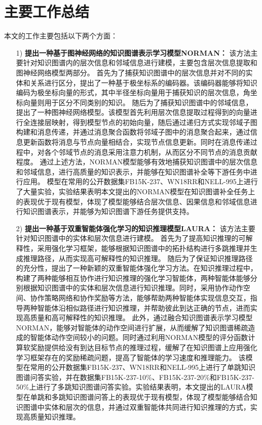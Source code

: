 \documentclass[algorithmlist, AutoFakeBold, AutoFakeSlant, figurelist, tablelist, nomlist, engineering]{seuthesix}
\begin{document}
\section{主要工作总结}
本文的工作主要包括以下两个方面：
\begin{itemize}
  \item [1)]\textbf{提出一种基于图神经网络的知识图谱表示学习模型NORMAN：}
  该方法主要针对知识图谱内的层次信息和邻域信息进行建模，主要包含层次信息提取和图神经网络模型两部分。
  首先为了捕获知识图谱中的层次信息并对不同的实体和关系进行区分，提出了一种基于极坐标系的编码器。该编码器能够将知识编码为极坐标向量的形式，其中半径坐标向量用于捕获知识的层次信息，角坐标向量则用于区分不同类别的知识。
  随后为了捕获知识图谱中的邻域信息，提出了一种图神经网络模型。该模型首先利用层次信息提取过程得到的向量进行全连接层映射，得到模型节点的初始向量，随后通过递归方式实现邻域子图构建和消息传递，并通过消息聚合函数将邻域子图中的消息聚合起来，通过信息更新函数将消息与节点向量相结合，实现节点信息更新。同时在消息传递过程中，对各个邻域节点的消息采用注意力机制，从而区分不同节点的消息贡献程度。
  通过上述方法，NORMAN模型能够有效地捕获知识图谱中的层次信息和邻域信息，进行高质量的知识表示，并能够在知识图谱补全等下游任务中进行应用。
  模型在常用的公开数据集FB15K-237、WN18RR和NELL-995上进行了大量实验，实验结果表明本文提出的NORMAN模型在知识图谱补全任务上的表现优于现有模型，体现了模型能够结合层次信息、因果信息和邻域信息进行知识图谱表示，并能够为知识图谱下游任务提供支持。
  \item [2)]\textbf{提出一种基于双重智能体强化学习的知识推理模型LAURA：}
  该方法主要针对知识图谱中的实体和层次信息进行建模。
  首先为了提高知识推理的可解释性，采用强化学习框架，能够根据知识图谱中的拓扑结构进行多跳推理并生成推理路径，从而实现高可解释性的知识推理。
  随后为了保证知识推理路径的充分性，提出了一种新颖的双重智能体强化学习方法。在知识推理过程中，构建了两种能够相互协作进行知识推理的强化学习智能体，两种智能体能够分别根据知识图谱中的实体和层次信息进行知识推理。同时，采用协作动作空间、协作策略网络和协作奖励等方法，能够帮助两种智能体实现信息交互，指导两种智能体沿相似路径进行知识推理，并帮助彼此到达正确的节点，进而实现高质量和高可解释性的知识推理。
  此外，通过融合知识图谱表示学习模型NORMAN，能够对智能体的动作空间进行扩展，从而缓解了知识图谱稀疏造成的智能体动作空间较小的问题。同时通过利用NORMAN模型的评分函数计算软奖励提供给没有到达目标节点的推理过程，缓解了在知识图谱上应用强化学习框架存在的奖励稀疏问题，提高了智能体的学习速度和推理能力。
  该模型在常用的公开数据集FB15K-237、WN18RR和NELL-995上进行了单跳知识图谱问答实验，并在数据集FB15K-237-10\%、FB15K-237-20\%和FB15K-237-50\%上进行了多跳知识图谱问答实验。实验结果表明，本文提出的LAURA模型在单跳和多跳知识图谱问答上的表现优于现有模型，体现了模型能够结合知识图谱中实体和层次的信息，并通过双重智能体共同进行知识推理的方式，实现高质量知识推理。
\end{itemize}
\end{document}
